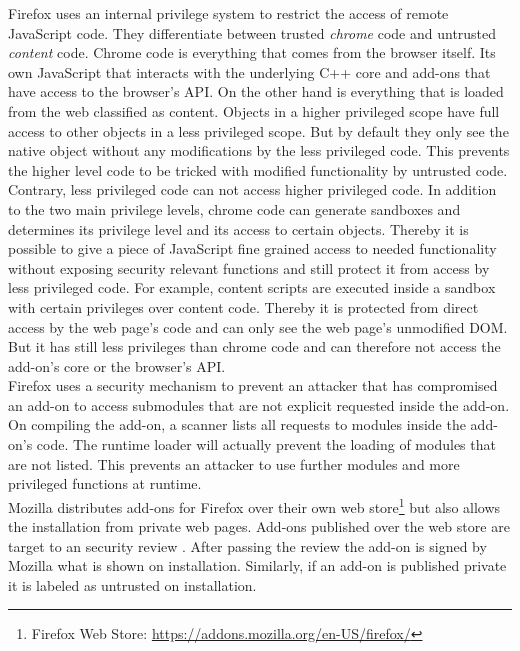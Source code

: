 \documentclass[article,colorback,accentcolor=tud9c,type=bsc]{tudthesis}
\begin{document}
	Firefox uses an internal privilege system to restrict the access of remote JavaScript code. They differentiate between trusted \textit{chrome} code and untrusted \textit{content} code. Chrome code is everything that comes from the browser itself. Its own JavaScript that interacts with the underlying C++ core and add-ons that have access to the browser's API. On the other hand is everything that is loaded from the web classified as content. Objects in a higher privileged scope have full access to other objects in a less privileged scope. But by default they only see the native object without any modifications by the less privileged code. This prevents the higher level code to be tricked with modified functionality by untrusted code. Contrary, less privileged code can not access higher privileged code. In addition to the two main privilege levels, chrome code can generate sandboxes and determines its privilege level and its access to certain objects. Thereby it is possible to give a piece of JavaScript fine grained access to needed functionality without exposing security relevant functions and still protect it from access by less privileged code. For example, content scripts are executed inside a sandbox with certain privileges over content code. Thereby it is protected from direct access by the web page's code and can only see the web page's unmodified DOM. But it has still less privileges than chrome code and can therefore not access the add-on's core or the browser's API. \\
	Firefox uses a security mechanism to prevent an attacker that has compromised an add-on to access submodules that are not explicit requested inside the add-on. On compiling the add-on, a scanner lists all requests to modules inside the add-on's code. The runtime loader will actually prevent the loading of modules that are not listed. This prevents an attacker to use further modules and more privileged functions at runtime. \\
	
	Mozilla distributes add-ons for Firefox over their own web store\footnote{Firefox Web Store: \url{https://addons.mozilla.org/en-US/firefox/}} but also allows the installation from private web pages. Add-ons published over the web store are target to an security review \cite{mozillaDevReviewPolicy}. After passing the review the add-on is signed by Mozilla what is shown on installation. Similarly, if an add-on is published private it is labeled as untrusted on installation. 
	
\end{document}
